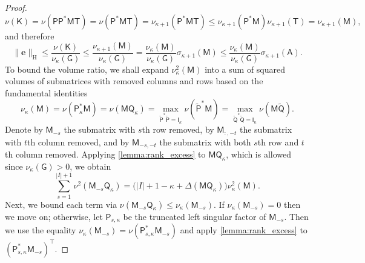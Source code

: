 \documentclass[onefignum,onetabnum]{siamart250211}
\renewenvironment{equation*}{\[}{\]\ignorespacesafterend}
\newcommand{\Hilb}{\mathrm{H}}
\newcommand{\Batrix}[1]{\bm{\Matrix{#1}}}
\newcommand{\Matrix}[1]{\mathsf{#1}}
\newcommand{\Bentry}[1]{{\bm{#1}}}
\newcommand{\trans}{\intercal}
\newcommand{\Index}[1]{{#1}}
\newcommand{\Norm}[3][]{#1\| #2 #1\|_{\mathrm{#3}}}
\begin{document}
\begin{proof}
\begin{equation*}
    \nu(\Batrix{K}) = \nu(\Batrix{P} \Batrix{P}^\ast \Batrix{M} \Matrix{T}) = \nu(\Batrix{P}^\ast \Batrix{M} \Matrix{T}) = \nu_{\kappa + 1}(\Batrix{P}^\ast \Batrix{M} \Matrix{T}) \leq \nu_{\kappa + 1}(\Batrix{P}^\ast \Batrix{M}) \nu_{\kappa + 1}(\Matrix{T}) = \nu_{\kappa + 1}(\Batrix{M}),
\end{equation*}
and therefore
\begin{equation*}
    \Norm{\Bentry{e}}{\Hilb} \leq \frac{\nu(\Batrix{K})}{\nu_{\kappa}(\Batrix{G})} \leq \frac{\nu_{\kappa + 1}(\Batrix{M})}{\nu_{\kappa}(\Batrix{G})} = \frac{\nu_{\kappa}(\Batrix{M})}{\nu_{\kappa}(\Batrix{G})} \sigma_{\kappa + 1}(\Batrix{M}) \leq \frac{\nu_{\kappa}(\Batrix{M})}{\nu_{\kappa}(\Batrix{G})} \sigma_{\kappa + 1}(\Batrix{A}).
\end{equation*}
To bound the volume ratio, we shall expand $\nu_{\kappa}^2(\Batrix{M})$ into a sum of squared volumes of submatrices with removed columns and rows based on the fundamental identities
\begin{equation*}
    \nu_{\kappa}(\Batrix{M}) = \nu(\Batrix{P}_{\kappa}^\ast \Batrix{M}) = \nu(\Batrix{M} \Matrix{Q}_{\kappa}) = \max_{\Batrix{\tilde{P}}^\ast \Batrix{\tilde{P}} = \Matrix{I}_{\kappa}} \nu(\Batrix{\tilde{P}}^\ast \Batrix{M}) = \max_{\Matrix{\tilde{Q}}^\ast \Matrix{\tilde{Q}} = \Matrix{I}_{\kappa}} \nu(\Batrix{M} \Matrix{\tilde{Q}}).
\end{equation*}
Denote by $\Batrix{M}_{-s}$ the submatrix with $s$th row removed, by $\Batrix{M}_{:, -t}$ the submatrix with $t$th column removed, and by $\Batrix{M}_{-s,-t}$ the submatrix with both $s$th row and $t$th column removed.
Applying \cref{lemma:rank_excess} to $\Batrix{M} \Matrix{Q}_\kappa$, which is allowed since $\nu_{\kappa}(\Batrix{G}) > 0$, we obtain
\begin{equation*}
    \sum_{s = 1}^{|\Index{I}| + 1} \nu^2(\Batrix{M}_{-s} \Matrix{Q}_\kappa) = \Big(|\Index{I}| + 1 - \kappa + \Delta(\Batrix{M} \Matrix{Q}_\kappa) \Big) \nu_{\kappa}^2(\Batrix{M}).
\end{equation*}
Next, we bound each term via $\nu(\Batrix{M}_{-s} \Matrix{Q}_\kappa) \leq \nu_{\kappa}(\Batrix{M}_{-s})$.
If $\nu_{\kappa}(\Batrix{M}_{-s}) = 0$ then we move on; otherwise, let $\Batrix{P}_{s,\kappa}$ be the truncated left singular factor of $\Batrix{M}_{-s}$.
Then we use the equality $\nu_{\kappa}(\Batrix{M}_{-s}) = \nu(\Batrix{P}_{s,\kappa}^\ast \Batrix{M}_{-s})$ and apply \cref{lemma:rank_excess} to $(\Batrix{P}_{s,\kappa}^\ast \Batrix{M}_{-s})^\trans$.

\end{proof}
\end{document}

